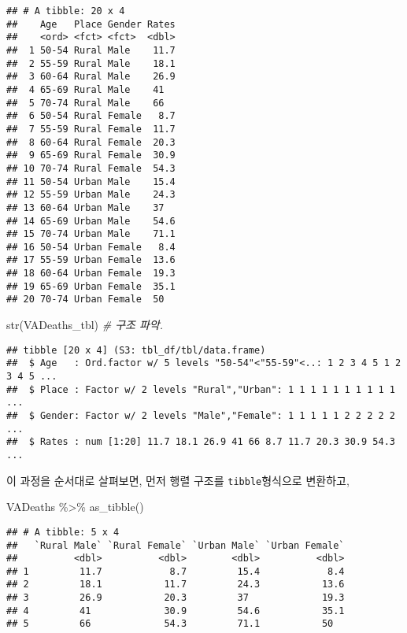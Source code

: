 \documentclass[
]{article}
\newenvironment{Shaded}{\begin{snugshade}}{\end{snugshade}}
\newcommand{\CommentTok}[1]{\textcolor[rgb]{0.56,0.35,0.01}{\textit{#1}}}
\newcommand{\FunctionTok}[1]{\textcolor[rgb]{0.00,0.00,0.00}{#1}}
\newcommand{\NormalTok}[1]{#1}
\newcommand{\SpecialCharTok}[1]{\textcolor[rgb]{0.00,0.00,0.00}{#1}}
\begin{document}
\begin{verbatim}
## # A tibble: 20 x 4
##    Age   Place Gender Rates
##    <ord> <fct> <fct>  <dbl>
##  1 50-54 Rural Male    11.7
##  2 55-59 Rural Male    18.1
##  3 60-64 Rural Male    26.9
##  4 65-69 Rural Male    41  
##  5 70-74 Rural Male    66  
##  6 50-54 Rural Female   8.7
##  7 55-59 Rural Female  11.7
##  8 60-64 Rural Female  20.3
##  9 65-69 Rural Female  30.9
## 10 70-74 Rural Female  54.3
## 11 50-54 Urban Male    15.4
## 12 55-59 Urban Male    24.3
## 13 60-64 Urban Male    37  
## 14 65-69 Urban Male    54.6
## 15 70-74 Urban Male    71.1
## 16 50-54 Urban Female   8.4
## 17 55-59 Urban Female  13.6
## 18 60-64 Urban Female  19.3
## 19 65-69 Urban Female  35.1
## 20 70-74 Urban Female  50
\end{verbatim}

\begin{Shaded}
\begin{Highlighting}[]
\FunctionTok{str}\NormalTok{(VADeaths\_tbl) }\CommentTok{\# 구조 파악.}
\end{Highlighting}
\end{Shaded}

\begin{verbatim}
## tibble [20 x 4] (S3: tbl_df/tbl/data.frame)
##  $ Age   : Ord.factor w/ 5 levels "50-54"<"55-59"<..: 1 2 3 4 5 1 2 3 4 5 ...
##  $ Place : Factor w/ 2 levels "Rural","Urban": 1 1 1 1 1 1 1 1 1 1 ...
##  $ Gender: Factor w/ 2 levels "Male","Female": 1 1 1 1 1 2 2 2 2 2 ...
##  $ Rates : num [1:20] 11.7 18.1 26.9 41 66 8.7 11.7 20.3 30.9 54.3 ...
\end{verbatim}

이 과정을 순서대로 살펴보면, 먼저 행렬 구조를 \texttt{tibble}형식으로
변환하고,

\begin{Shaded}
\begin{Highlighting}[]
\NormalTok{VADeaths }\SpecialCharTok{\%\textgreater{}\%}
  \FunctionTok{as\_tibble}\NormalTok{()}
\end{Highlighting}
\end{Shaded}

\begin{verbatim}
## # A tibble: 5 x 4
##   `Rural Male` `Rural Female` `Urban Male` `Urban Female`
##          <dbl>          <dbl>        <dbl>          <dbl>
## 1         11.7            8.7         15.4            8.4
## 2         18.1           11.7         24.3           13.6
## 3         26.9           20.3         37             19.3
## 4         41             30.9         54.6           35.1
## 5         66             54.3         71.1           50
\end{verbatim}
\end{document}
